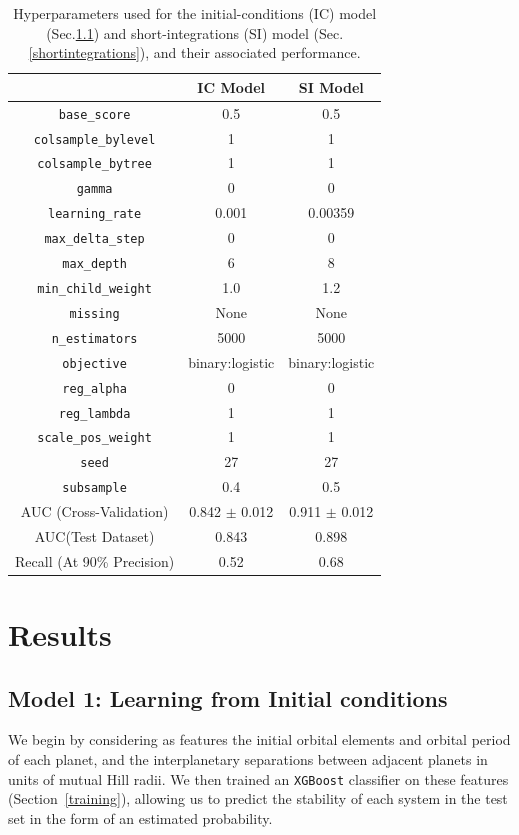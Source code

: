 \begin{table}[h]
\begin{center}
\caption{Hyperparameters used for the initial-conditions (IC) model (Sec.\:\ref{IC}) and short-integrations (SI) model (Sec.\:\ref{shortintegrations}), and their associated performance. \label{hyper}}
\begin{tabular}{ c|c|c}
 	& IC Model & SI Model \\
  \hline \hline			

  {\tt base\_score} & 0.5 & 0.5\\
  {\tt colsample\_bylevel} & 1 & 1\\
  {\tt colsample\_bytree} & 1 & 1\\
  {\tt gamma} & 0 & 0\\
  {\tt learning\_rate} & 0.001 & 0.00359 \\
  {\tt max\_delta\_step} & 0 & 0 \\
  {\tt max\_depth} & 6 & 8 \\
  {\tt min\_child\_weight} & 1.0 & 1.2 \\
  {\tt missing} & None & None \\
  {\tt n\_estimators} & 5000 & 5000 \\
  {\tt objective} & binary:logistic & binary:logistic\\
  {\tt reg\_alpha} & 0 & 0 \\
  {\tt reg\_lambda} & 1 & 1 \\
  {\tt scale\_pos\_weight} & 1 & 1\\
  {\tt seed} & 27 & 27 \\
  {\tt subsample} & 0.4 & 0.5\\
  \hline \hline
  AUC (Cross-Validation) & 0.842 $\pm$ 0.012 & 0.911 $\pm$ 0.012\\
  AUC(Test Dataset) & 0.843 & 0.898 \\
  Recall (At 90\% Precision) & 0.52 & 0.68\\
    \hline  
\end{tabular}
\end{center}
\end{table}

\section{Results} \label{results}
\subsection{Model 1: Learning from Initial conditions} \label{IC}
We begin by considering as features the initial orbital elements and orbital period of each planet, and the interplanetary separations between adjacent planets in units of mutual Hill radii. 
We then trained an {\tt XGBoost} classifier on these features (Section~\ref{training}), allowing us to predict the stability of each system in the test set in the form of an estimated probability. 


